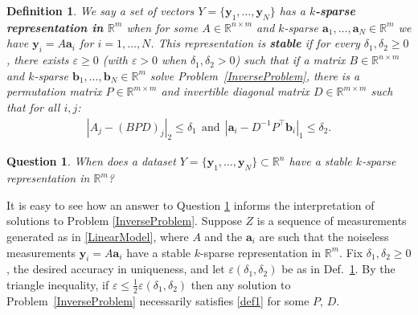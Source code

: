 \documentclass[journal, twocolumn]{IEEEtran}
\newtheorem{question}{Question}
\newtheorem{definition}{Definition}
\begin{document}
\begin{definition}\label{Uniqueness}
We say a set of vectors $Y = \{ \mathbf{y}_1, \ldots, \mathbf{y}_N\}$ has a \textbf{$k$-sparse representation in $\mathbb{R}^m$} when for some $A \in \mathbb{R}^{n \times m}$ and $k$-sparse $\mathbf{a}_1, \ldots, \mathbf{a}_N \in \mathbb{R}^m$ we have $\mathbf{y}_i = A\mathbf{a}_i$ for $i = 1, \ldots, N$. This representation is \textbf{stable} if for every $\delta_1, \delta_2 \geq 0$, there exists $\varepsilon \geq 0$ (with $\varepsilon > 0$ when  $\delta_1, \delta_2 > 0$) such that if a matrix $B \in \mathbb{R}^{n \times m}$ and $k$-sparse $\mathbf{b}_1, \ldots, \mathbf{b}_N \in \mathbb{R}^m$ 
solve Problem~\ref{InverseProblem},
there is a permutation matrix $P \in \mathbb{R}^{m \times m}$ and invertible diagonal matrix $D \in \mathbb{R}^{m \times m}$ such that for all $i,j$:
\begin{align}\label{def1}
|A_j - (BPD)_j|_2 \leq \delta_1 \ \ \text{and} \ \ |\mathbf{a}_i - D^{-1}P^{\top}\mathbf{b}_i|_1 \leq \delta_2.
\end{align}
\end{definition}

\begin{question}\label{DUTproblem}
When does a dataset $Y = \{\mathbf{y}_1, \ldots, \mathbf{y}_N \} \subset \mathbb{R}^n$ have a stable $k$-sparse representation in $\mathbb{R}^m$?
\end{question}

It is easy to see how an answer to Question \ref{DUTproblem} informs the interpretation of solutions to Problem \ref{InverseProblem}. Suppose $Z$ is a sequence of measurements generated as in \eqref{LinearModel}, where $A$ and the $\mathbf{a}_i$ are such that the  noiseless measurements $\mathbf{y}_i = A\mathbf{a}_i$ have a stable $k$-sparse representation in $\mathbb{R}^m$. Fix $\delta_1, \delta_2 \geq 0$, the desired accuracy in uniqueness, and let $\varepsilon(\delta_1, \delta_2)$ be as in Def.~\ref{Uniqueness}. By the triangle inequality, if $\varepsilon \leq \frac{1}{2}\varepsilon(\delta_1, \delta_2)$ then any solution to Problem~\ref{InverseProblem} necessarily satisfies \eqref{def1} for some $P$, $D$. 
\end{document}
